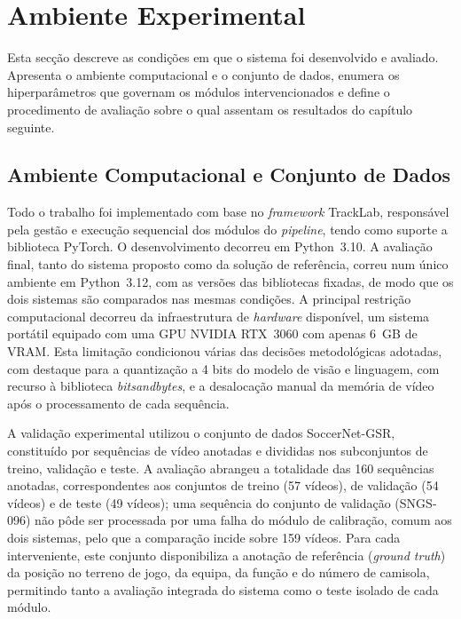 \FloatBarrier

\section{Ambiente Experimental}

Esta secção descreve as condições em que o sistema foi desenvolvido e avaliado. Apresenta o ambiente computacional e o conjunto de dados, enumera os hiperparâmetros que governam os módulos intervencionados e define o procedimento de avaliação sobre o qual assentam os resultados do capítulo seguinte.

\subsection{Ambiente Computacional e Conjunto de Dados}\label{sec:ambiente}

Todo o trabalho foi implementado com base no \emph{framework} TrackLab, responsável pela gestão e execução sequencial dos módulos do \emph{pipeline}, tendo como suporte a biblioteca PyTorch. O desenvolvimento decorreu em Python~3.10. A avaliação final, tanto do sistema proposto como da solução de referência, correu num único ambiente em Python~3.12, com as versões das bibliotecas fixadas, de modo que os dois sistemas são comparados nas mesmas condições. A principal restrição computacional decorreu da infraestrutura de \emph{hardware} disponível, um sistema portátil equipado com uma GPU NVIDIA RTX~3060 com apenas 6~GB de VRAM. Esta limitação condicionou várias das decisões metodológicas adotadas, com destaque para a quantização a 4 bits do modelo de visão e linguagem, com recurso à biblioteca \emph{bitsandbytes}, e a desalocação manual da memória de vídeo após o processamento de cada sequência.

A validação experimental utilizou o conjunto de dados SoccerNet-GSR, constituído por sequências de vídeo anotadas e divididas nos subconjuntos de treino, validação e teste. A avaliação abrangeu a totalidade das 160 sequências anotadas, correspondentes aos conjuntos de treino (57 vídeos), de validação (54 vídeos) e de teste (49 vídeos); uma sequência do conjunto de validação (SNGS-096) não pôde ser processada por uma falha do módulo de calibração, comum aos dois sistemas, pelo que a comparação incide sobre 159 vídeos. Para cada interveniente, este conjunto disponibiliza a anotação de referência (\emph{ground truth}) da posição no terreno de jogo, da equipa, da função e do número de camisola, permitindo tanto a avaliação integrada do sistema como o teste isolado de cada módulo.

